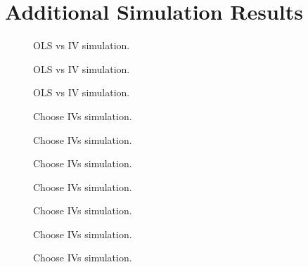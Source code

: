 \section{Additional Simulation Results}

\begin{figure}
\centering
	
	\caption{OLS vs IV simulation.}
\end{figure}

\begin{figure}
\centering
	
	\caption{OLS vs IV simulation.}
\end{figure}

\begin{figure}
\centering
	
	\caption{OLS vs IV simulation.}
\end{figure}


\begin{figure}
\centering
	
	\caption{Choose IVs simulation.}
\end{figure}

\begin{figure}
\centering
	
	\caption{Choose IVs simulation.}
\end{figure}

\begin{figure}
\centering
	
	\caption{Choose IVs simulation.}
\end{figure}

\begin{figure}
\centering
	
	\caption{Choose IVs simulation.}
\end{figure}

\begin{figure}
\centering
	
	\caption{Choose IVs simulation.}
\end{figure}

\begin{figure}
\centering
	
	\caption{Choose IVs simulation.}
\end{figure}

\begin{figure}
\centering
	
	\caption{Choose IVs simulation.}
\end{figure}
